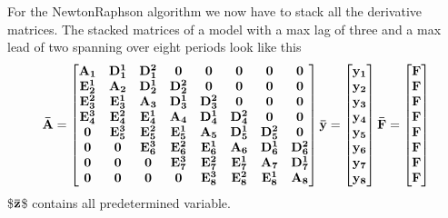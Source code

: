 \documentclass[letterpaper,10pt,english]{jupyterBook}
\begin{document}
\sphinxAtStartPar
For the Newton\sphinxhyphen{}Raphson algorithm we now have to stack all the derivative matrices. The stacked matrices of a model with a max lag of three and a max lead of two spanning over eight periods look like this 
\begin{equation*}
\begin{split}\bf{\bar A} =\begin{bmatrix}
		\bf{A_1}   & \bf{D_1^1} & \bf{D_1^2} & \bf{0}     &\bf{0}      &\bf{0}      &\bf{0}      &\bf{0}  \\
        \bf{E_2^1} & \bf{A_2}   & \bf{D_2^1} & \bf{D_2^2} &\bf{0}      &\bf{0}      &\bf{0}      &\bf{0} \\
        \bf{E_3^2} & \bf{E_3^1} & \bf{A_3}   & \bf{D_3^1} & \bf{D_3^2} &\bf{0}      &\bf{0}      &\bf{0} \\
        \bf{E_4^3} & \bf{E_4^2} & \bf{E_4^1} & \bf{A_4}   & \bf{D_4^1} & \bf{D_4^2} &\bf{0}      & \bf{0} \\
        \bf{0}     & \bf{E_5^3} & \bf{E_5^2} & \bf{E_5^1} & \bf{A_5}   & \bf{D_5^1} & \bf{D_5^2} &\bf{0}\\
        \bf{0}     & \bf{0}     & \bf{E_6^3} & \bf{E_6^2} & \bf{E_6^1} & \bf{A_6}   & \bf{D_6^1} & \bf{D_6^2}\\
        \bf{0}     & \bf{0}     & \bf{0}     & \bf{E_7^3} & \bf{E_7^2} & \bf{E_7^1} & \bf{A_7}   & \bf{D_7^1} \\
        \bf{0}     & \bf{0}     & \bf{0}     & \bf{0}     & \bf{E_8^3} & \bf{E_8^2} & \bf{E_8^1} & \bf{A_8} \\
\end{bmatrix} \bar y = \begin{bmatrix}\bf{y_1}\\\bf{y_2}\\\bf{y_3}\\ \bf{y_4} \\\bf{y_5} \\\bf{y_6} \\ \bf{y_7} \\ \bf{y_8} \end{bmatrix} \bar F = \begin{bmatrix}\bf{F}\\\bf{F}\\\bf{F}\\ \bf{F} \\\bf{F} \\\bf{F} \\ \bf{F} \\ \bf{F} \end{bmatrix}\end{split}
\end{equation*}
\sphinxAtStartPar
\$\(\bf \bar z\)\$ contains all predetermined variable.
\end{document}
